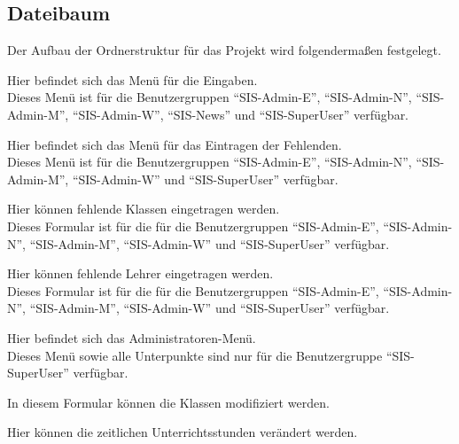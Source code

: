 \subsection{Dateibaum}
\label{sec:files}
Der Aufbau der Ordnerstruktur für das Projekt wird folgendermaßen festgelegt.

\begin{description}[style=nextline]
	\item[/backend/]
		Hier befindet sich das Menü für die Eingaben.\\
		Dieses Menü ist für die Benutzergruppen \enquote{SIS-Admin-E}, \enquote{SIS-Admin-N}, \enquote{SIS-Admin-M}, \enquote{SIS-Admin-W}, \enquote{SIS-News} und \enquote{SIS-SuperUser} verfügbar.
		\begin{description}[style=nextline]
			\item[./absentees/]
				Hier befindet sich das Menü für das Eintragen der Fehlenden.\\
				Dieses Menü ist für die Benutzergruppen \enquote{SIS-Admin-E}, \enquote{SIS-Admin-N}, \enquote{SIS-Admin-M}, \enquote{SIS-Admin-W} und \enquote{SIS-SuperUser} verfügbar.
				\begin{description}[style=nextline]
					\item[./classes/]
						Hier können fehlende Klassen eingetragen werden.\\
						Dieses Formular ist für die für die Benutzergruppen \enquote{SIS-Admin-E}, \enquote{SIS-Admin-N}, \enquote{SIS-Admin-M}, \enquote{SIS-Admin-W} und \enquote{SIS-SuperUser} verfügbar.
					\item[./teachers/]
						Hier können fehlende Lehrer eingetragen werden.\\
						Dieses Formular ist für die für die Benutzergruppen \enquote{SIS-Admin-E}, \enquote{SIS-Admin-N}, \enquote{SIS-Admin-M}, \enquote{SIS-Admin-W} und \enquote{SIS-SuperUser} verfügbar.
				\end{description}
				\item[./administration/]
					Hier befindet sich das Administratoren-Menü.\\
					Dieses Menü sowie alle Unterpunkte sind nur für die Benutzergruppe \enquote{SIS-SuperUser} verfügbar.
					\begin{description}[style=nextline]
						\item[./classes/]
							In diesem Formular können die Klassen modifiziert werden.
						\item[./hours/]
							Hier können die zeitlichen Unterrichtsstunden verändert werden.

\end{description}
\end{description}
\end{description}
